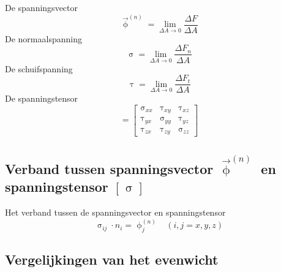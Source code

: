             De spanningsvector
            \begin{equation}
                \vec{\upphi}^{(n)} = \lim_{\Delta A \rightarrow 0} \frac{\Delta F}{\Delta A}
                \label{spanningsvector}
            \end{equation}
            De normaalspanning
            \begin{equation}
                \upsigma = \lim_{\Delta A \rightarrow 0} \frac{\Delta F_n}{\Delta A}
                \label{normaalspanning}
            \end{equation}
            De schuifspanning
            \begin{equation}
                \uptau = \lim_{\Delta A \rightarrow 0} \frac{\Delta F_t}{\Delta A}
                \label{schuifspanning}
            \end{equation}
            De spanningstensor
            \begin{equation}
                [\sigma] = \left[\begin{matrix}
                    \upsigma_{xx} & \uptau_{xy} & \uptau_{xz} \\
                    \uptau_{yx} & \upsigma_{yy} & \uptau_{yz} \\
                    \uptau_{zx} & \uptau_{zy} & \upsigma_{zz}
                \end{matrix}\right]
                \label{spanningstensor}
            \end{equation}

        \subsection{Verband tussen spanningsvector $\vec{\upphi}^{(n)}$ en spanningstensor $[\upsigma]$}
            
            Het verband tussen de spanningsvector en spanningstensor
            \begin{equation}
                \upsigma_{ij}\cdot n_i = \upphi_j^{(n)} \;\;\; (i,j=x,y,z)
                \label{spannigsvector_tensor}
            \end{equation}

        \subsection{Vergelijkingen van het evenwicht}

